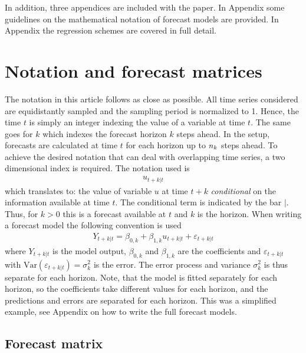 In addition, three appendices are included with the paper. In Appendix
 some guidelines on the mathematical notation of
forecast models are provided. In Appendix
 the regression schemes are covered in full detail.


\section{Notation and forecast matrices}\label{sec:model-forecast-matrix}
The notation in this article follows \cite{madsen2007time} as close as possible. All time series considered are equidistantly sampled and the sampling period is normalized to 1. Hence, the time $t$ is simply an integer indexing the value of a variable at time $t$. The same goes for $k$ which indexes the forecast horizon $k$ steps ahead. In the \onlineforecast setup, forecasts are calculated at time $t$ for each
horizon up to $n_k$ steps ahead. To achieve the desired notation that can
deal with overlapping time series, a two dimensional index is required. The
notation used is
\begin{align}
  u_{t+k|t}
\end{align}
which translates to: the value of variable $u$ at time $t+k$ \emph{conditional}
on the information available at time $t$. The conditional term is indicated
by the bar $|$. Thus, for $k > 0$ this is a forecast available at $t$ and $k$ is
the horizon. When writing a forecast model the following convention is used
\begin{align}
  Y_{t+k|t} = \beta_{0,k} + \beta_{1,k} u_{t+k|t} + \varepsilon_{t+k|t}
\end{align}
where $Y_{t+k|t}$ is the model output, $\beta_{0,k}$ and $\beta_{1,k}$ are the
coefficients and $\varepsilon_{t+k|t}$ with
$\mathrm{Var}(\varepsilon_{t+k|t})=\sigma^2_k$ is the error. The error process
and variance $\sigma^2_k$ is thus separate for each horizon. Note, that the
model is fitted separately for each horizon, so the coefficients take different
values for each horizon, and the predictions and errors are separated for each
horizon. This was a simplified example, see Appendix 
on how to write the full forecast models.


\subsection{Forecast matrix}

